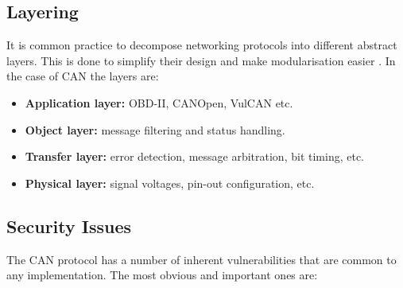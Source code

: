 \subsection{Layering}
\label{subsec:can:layering}

It is common practice to decompose networking protocols into different abstract layers. This is done to simplify their design and make modularisation easier \cite{wiki:ProtocolStack}. In the case of CAN the layers are:

\begin{itemize}
	\item \textbf{Application layer:} OBD-II, CANOpen, VulCAN etc.
	\item \textbf{Object layer:} message filtering and status handling.
	\item \textbf{Transfer layer:} error detection, message arbitration, bit timing, etc.
	\item \textbf{Physical layer:} signal voltages, pin-out configuration, etc.
\end{itemize}

\subsection{Security Issues}
\label{subsec:can:security_issues}

The CAN protocol has a number of inherent vulnerabilities that are common to any implementation. The most obvious and important ones are:

